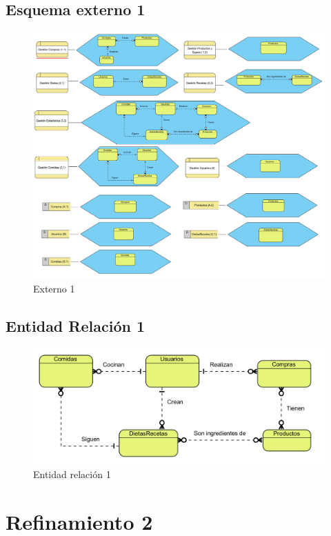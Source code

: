 \documentclass[a4paper,12pt]{report}
\begin{document}
\section{Esquema externo 1}
\label{sec-5-2}
\begin{figure}[!htp]
\centering
\includegraphics[width=1\linewidth]{./refinamientos/externo1.png}
\caption{Externo 1}
\label{fig:Externo 1}
\medskip
\footnotesize
{}
\end{figure}
\section{Entidad Relación 1}
\label{sec-5-3}
\begin{figure}[!htp]
\centering
\includegraphics[width=0.7\linewidth]{./refinamientos/er1.png}
\caption{Entidad relación 1}
\label{fig:Entidad relación 1}
\medskip
\footnotesize
{}
\end{figure}
\chapter{Refinamiento 2}
\label{sec-6}
\end{document}
